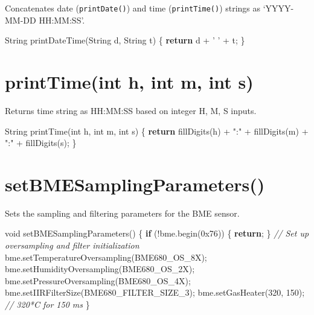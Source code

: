 \documentclass[]{book}
\newenvironment{Shaded}{\begin{snugshade}}{\end{snugshade}}
\newcommand{\BaseNTok}[1]{\textcolor[rgb]{0.00,0.00,0.81}{#1}}
\newcommand{\CharTok}[1]{\textcolor[rgb]{0.31,0.60,0.02}{#1}}
\newcommand{\CommentTok}[1]{\textcolor[rgb]{0.56,0.35,0.01}{\textit{#1}}}
\newcommand{\ControlFlowTok}[1]{\textcolor[rgb]{0.13,0.29,0.53}{\textbf{#1}}}
\newcommand{\DataTypeTok}[1]{\textcolor[rgb]{0.13,0.29,0.53}{#1}}
\newcommand{\DecValTok}[1]{\textcolor[rgb]{0.00,0.00,0.81}{#1}}
\newcommand{\NormalTok}[1]{#1}
\newcommand{\StringTok}[1]{\textcolor[rgb]{0.31,0.60,0.02}{#1}}
\begin{document}
Concatenates date (\texttt{printDate()}) and time (\texttt{printTime()}) strings as `YYYY-MM-DD HH:MM:SS'.

\begin{Shaded}
\begin{Highlighting}[]
\NormalTok{String printDateTime(String d, String t) \{}
  \ControlFlowTok{return}\NormalTok{ d + }\CharTok{' '}\NormalTok{ + t;}
\NormalTok{\}}
\end{Highlighting}
\end{Shaded}

\hypertarget{printtimeint-h-int-m-int-s}{%
\section*{printTime(int h, int m, int s)}\label{printtimeint-h-int-m-int-s}}

Returns time string as HH:MM:SS based on integer H, M, S inputs.

\begin{Shaded}
\begin{Highlighting}[]
\NormalTok{String printTime(}\DataTypeTok{int}\NormalTok{ h, }\DataTypeTok{int}\NormalTok{ m, }\DataTypeTok{int}\NormalTok{ s) \{}
  \ControlFlowTok{return}\NormalTok{ fillDigits(h) + }\StringTok{":"}\NormalTok{ + fillDigits(m) + }\StringTok{":"}\NormalTok{ + fillDigits(s);}
\NormalTok{\}}
\end{Highlighting}
\end{Shaded}

\hypertarget{setbmesamplingparameters}{%
\section*{setBMESamplingParameters()}\label{setbmesamplingparameters}}

Sets the sampling and filtering parameters for the BME sensor.

\begin{Shaded}
\begin{Highlighting}[]
\DataTypeTok{void}\NormalTok{ setBMESamplingParameters() \{}
  \ControlFlowTok{if}\NormalTok{ (!bme.begin(}\BaseNTok{0x76}\NormalTok{)) \{}
    \ControlFlowTok{return}\NormalTok{;}
\NormalTok{  \}}
  \CommentTok{// Set up oversampling and filter initialization}
\NormalTok{  bme.setTemperatureOversampling(BME680_OS_8X);}
\NormalTok{  bme.setHumidityOversampling(BME680_OS_2X);}
\NormalTok{  bme.setPressureOversampling(BME680_OS_4X);}
\NormalTok{  bme.setIIRFilterSize(BME680_FILTER_SIZE_3);}
\NormalTok{  bme.setGasHeater(}\DecValTok{320}\NormalTok{, }\DecValTok{150}\NormalTok{); }\CommentTok{// 320*C for 150 ms}
\NormalTok{\}}
\end{Highlighting}
\end{Shaded}
\end{document}
